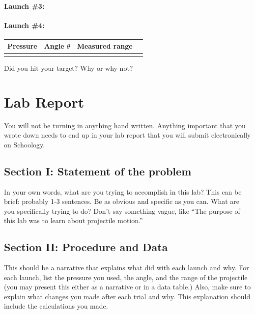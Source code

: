\documentclass[10pt]{exam}
\begin{document}
\datatable
\vs

\paragraph{Launch \#3:}\hfill

\datatable
\vs


\paragraph{Launch \#4:}\hfill

\begin{tabular}{|c|c|c|c|}
  \hline
  Pressure & Angle $\theta$ & Measured range \\\hline
           &                &                \\[1em]
  \hline
\end{tabular}

\vspace{0.5em}

{\small Did you hit your target?  Why or why not?}

\pagebreak


\section*{Lab Report} You will not be turning in anything hand written.  Anything important that you wrote down needs to end up in your lab report that you will submit electronically on Schoology.

\subsection*{Section I: Statement of the problem}
In your own words, what are you trying to accomplish in this lab?  This can be brief: probably 1-3 sentences.  Be as obvious and specific as you can.  What are you specifically trying to do?  Don't say something vague, like ``The purpose of this lab was to learn about projectile motion.''

\subsection*{Section II: Procedure and Data}
This should be a narrative that explains what did with each launch and why.  For each launch, list the pressure you used, the angle, and the range of the projectile (you may present this either as a narrative or in a data table.)  Also, make sure to explain what changes you made after each trial and why.  This explanation should include the calculations you made.
\end{document}
